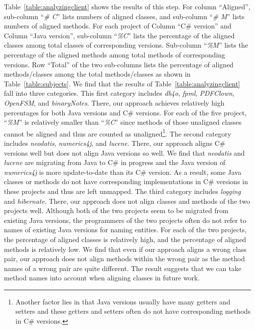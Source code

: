 Table~\ref{table:analyzingclient} shows the results of this step.
For column ``Aligned'', sub-column ``\emph{\# C}'' lists numbers of
aligned classes, and sub-column ``\emph{\# M}'' lists numbers of
aligned methods. For each project of Column ``C\# version'' and
Column ``Java version'', sub-column ``\emph{\%C}'' lists the
percentage of the aligned classes among total classes of
corresponding versions. Sub-column ``\emph{\%M}'' lists the
percentage of the aligned methods among total methods of
corresponding versions. Row ``Total'' of the two sub-columns lists
the percentage of aligned methods/classes among the total
methods/classes as shown in Table~\ref{table:subjects}. We find that
the results of Table~\ref{table:analyzingclient} fall into three
categories. This first category includes \emph{db4o}, \emph{fpml},
\emph{PDFClown}, \emph{OpenFSM}, and \emph{binaryNotes}. There, our
approach achieves relatively high percentages for both Java versions
and C\# versions. For each of the five project, ``\emph{\%M}'' is
relatively smaller than ``\emph{\%C}'' since methods of those
unaligned classes cannot be aligned and thus are counted as
unaligned\footnote{Another factor lies in that Java versions usually
have many getters and setters and these getters and setters often do
not have corresponding methods in C\# versions.}. The second
category includes \emph{neodatis}, \emph{numerics4j}, and
\emph{lucene}. There, our approach aligns C\# versions well but does
not align Java versions so well. We find that \emph{neodatis} and
\emph{lucene} are migrating from Java to C\# in progress and the
Java version of \emph{numerics4j} is more update-to-date than its
C\# version. As a result, some Java classes or methods do not have
corresponding implementations in C\# versions in these projects and
thus are left unmapped. The third category includes \emph{logging}
and \emph{hibernate}. There, our approach does not align classes and
methods of the two projects well. Although both of the two projects
seem to be migrated from existing Java versions, the programmers of
the two projects often do not refer to names of existing Java
versions for naming entities. For each of the two projects, the
percentage of aligned classes is relatively high, and the percentage
of aligned methods is relatively low. We find that even if our
approach aligns a wrong class pair, our approach does not align
methods within the wrong pair as the method names of a wrong pair
are quite different. The result suggests that we can take method
names into account when aligning classes in future work.

